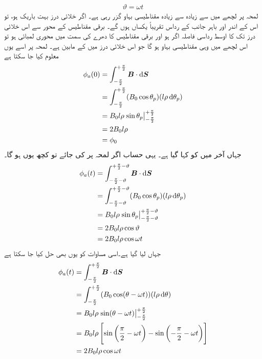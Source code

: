 \begin{align}
\vartheta=\omega t
\end{align}
لمحہ  پر لچھے میں سے زیادہ سے زیادہ مقناطیسی بہاو گزر رہی ہے۔ اگر خلائی درز بہت باریک ہو، تو اس کے اندر اور باہر جانب کے رداس تقریباً یکساں ہوں گے۔ برقی مقناطیس کے محور سے اس خلائی درز تک کا اوسط رداسی فاصلہ اگر  ہو اور برقی مقناطیس کا دھرے کی سمت میں محوری لمبائی  ہو تو اس لچھے میں وہی مقناطیسی بہاو ہو گا جو اس خلائی درز میں    کے مابین ہے۔ لمحہ  پر اسے یوں معلوم کیا جا سکتا ہے
\begin{gather}
\begin{aligned}\label{مساوات_گھومتے_مشین_قطب_پر_بہاو}
\phi_a(0)&=\int_{-\frac{\pi}{2}}^{+\frac{\pi}{2}} \kvec{B} \cdot \dif \kvec{S}\\
&=\int_{-\frac{\pi}{2}}^{+\frac{\pi}{2}} (B_0 \cos \theta_p)(l \rho \dif \theta_p)\\
&=B_0 l \rho \left. \sin \theta_p \right|_{-\frac{\pi}{2}}^{+\frac{\pi}{2}}\\
&=2 B_0 l \rho\\
&=\phi_0
\end{aligned}
\end{gather}
جہاں آخر میں   کو  کہا گیا ہے۔ یہی حساب اگر لمحہ  پر کی جائے تو کچھ یوں ہو گا۔
\begin{gather}
\begin{aligned}
\phi_a(t)&=\int_{-\frac{\pi}{2}-\vartheta}^{+\frac{\pi}{2}-\vartheta} \kvec{B} \cdot \dif \kvec{S}\\
&=\int_{-\frac{\pi}{2}-\vartheta}^{+\frac{\pi}{2}-\vartheta} (B_0 \cos \theta_p)(l \rho \dif \theta_p)\\
&=B_0 l \rho \left. \sin \theta_p \right|_{-\frac{\pi}{2}-\vartheta}^{+\frac{\pi}{2}-\vartheta}\\
&=2 B_0 l \rho \cos \vartheta\\
&=2 B_0 l \rho \cos \omega t
\end{aligned}
\end{gather}
جہاں  لیا گیا ہے۔اسی مساوات کو یوں بھی حل کیا جا سکتا ہے
\begin{gather}
\begin{aligned}\label{مساوات_گھومتے_مشین_قطبی_بہاو_بالمقابل_وقت}
\phi_a(t)&=\int_{-\frac{\pi}{2}}^{+\frac{\pi}{2}} \kvec{B} \cdot \dif \kvec{S}\\
&=\int_{-\frac{\pi}{2}}^{+\frac{\pi}{2}} (B_0 \cos (\theta-\omega t))(l \rho \dif \theta)\\
&=B_0 l \rho \left. \sin (\theta-\omega t) \right|_{-\frac{\pi}{2}}^{+\frac{\pi}{2}}\\
&=B_0 l \rho \left[\sin \left(\frac{\pi}{2}-\omega t \right )-\sin \left (-\frac{\pi}{2}-\omega t \right) \right]\\
&=2 B_0 l \rho \cos \omega t
\end{aligned}
\end{gather}
